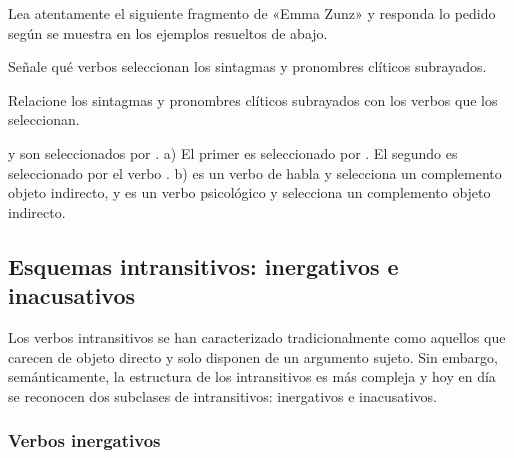 \begin{ejercicio}\label{ej:07-seleccion2}
Lea atentamente el siguiente fragmento de «Emma Zunz» y responda lo pedido según
se muestra en los ejemplos resueltos de abajo.

\begin{consignas}
  \item Señale qué verbos seleccionan los sintagmas y pronombres clíticos
        subrayados.
  \item Relacione los sintagmas y pronombres clíticos subrayados con los verbos
        que los seleccionan.
\end{consignas}


\begin{resuelto}
 y  son seleccionados por
. a) El primer  es seleccionado por .
El segundo  es seleccionado por el verbo . b)
 es un verbo de habla y selecciona un complemento objeto
indirecto, y  es un verbo psicológico y selecciona un complemento
objeto indirecto.
\end{resuelto}
\end{ejercicio}

\subsection{Esquemas intransitivos: inergativos e inacusativos}\label{sec:07-intransitivos}

Los verbos intransitivos se han caracterizado tradicionalmente como aquellos que
carecen de objeto directo y solo disponen de un argumento sujeto. Sin embargo,
semánticamente, la estructura de los intransitivos es más compleja y hoy en día
se reconocen dos subclases de intransitivos: inergativos e inacusativos.

\subsubsection{Verbos inergativos}\label{sec:07-inergativos}

